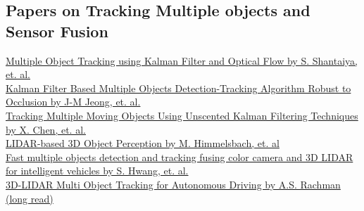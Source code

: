 \documentclass[11pt, a4paper]{article}
\begin{document}
\subsection{Papers on Tracking Multiple objects and Sensor Fusion}%
\label{sec:other_papers_on_tracking_multiple_objects_and_sensor_fusion}


\href{http://www.ejaet.com/PDF/2-2/EJAET-2-2-34-39.pdf}{Multiple Object Tracking using Kalman Filter and Optical Flow by S. Shantaiya, et. al.} \\

\href{https://pdfs.semanticscholar.org/f5a2/bf3df3126d2923a617b977ec2b4e1c829a08.pdf}{Kalman Filter Based Multiple Objects Detection-Tracking Algorithm Robust to Occlusion by J-M Jeong, et. al.} \\

\href{https://arxiv.org/pdf/1802.01235.pdf}{Tracking Multiple Moving Objects Using Unscented Kalman Filtering Techniques by X. Chen, et. al.} \\

\href{https://velodynelidar.com/lidar/hdlpressroom/pdf/Articles/LIDAR-based%203D%20Object%20Perception.pdf}{LIDAR-based 3D Object Perception by M. Himmelsbach, et. al} \\

\href{https://www.researchgate.net/publication/309503024_Fast_multiple_objects_detection_and_tracking_fusing_color_camera_and_3D_LIDAR_for_intelligent_vehicles}{Fast multiple objects detection and tracking fusing color camera and 3D LIDAR for intelligent vehicles by S. Hwang, et. al.} \\

\href{https://repository.tudelft.nl/islandora/object/uuid%3Af536b829-42ae-41d5-968d-13bbaa4ec736}{3D-LIDAR Multi Object Tracking for Autonomous Driving by A.S. Rachman (long read)} 
\end{document}
